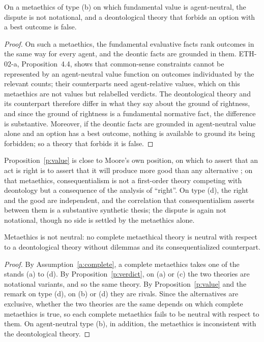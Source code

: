 \documentclass{situationist-preprint}
\begin{document}
\begin{proposition}\label{p:value}
On a metaethics of type (b) on which fundamental value is agent-neutral, the dispute is not notational, and a deontological theory that forbids an option with a best outcome is false.
\end{proposition}

\begin{proof}
On such a metaethics, the fundamental evaluative facts rank outcomes in the same way for every agent, and the deontic facts are grounded in them. ETH-02-a, Proposition~4.4, shows that common-sense constraints cannot be represented by an agent-neutral value function on outcomes individuated by the relevant counts; their counterparts need agent-relative values, which on this metaethics are not values but relabelled verdicts. The deontological theory and its counterpart therefore differ in what they say about the ground of rightness, and since the ground of rightness is a fundamental normative fact, the difference is substantive. Moreover, if the deontic facts are grounded in agent-neutral value alone and an option has a best outcome, nothing is available to ground its being forbidden; so a theory that forbids it is false.
\end{proof}

Proposition~\ref{p:value} is close to Moore's own position, on which to assert that an act is right is to assert that it will produce more good than any alternative \citep[ch.~5]{Moore1903}; on that metaethics, consequentialism is not a first-order theory competing with deontology but a consequence of the analysis of \enquote{right}. On type (d), the right and the good are independent, and the correlation that consequentialism asserts between them is a substantive synthetic thesis; the dispute is again not notational, though no side is settled by the metaethics alone.

\begin{theorem}\label{t:main}
Metaethics is not neutral: no complete metaethical theory is neutral with respect to a deontological theory without dilemmas and its consequentialized counterpart.
\end{theorem}

\begin{proof}
By Assumption~\ref{a:complete}, a complete metaethics takes one of the stands (a) to (d). By Proposition~\ref{p:verdict}, on (a) or (c) the two theories are notational variants, and so the same theory. By Proposition~\ref{p:value} and the remark on type (d), on (b) or (d) they are rivals. Since the alternatives are exclusive, whether the two theories are the same depends on which complete metaethics is true, so each complete metaethics fails to be neutral with respect to them. On agent-neutral type (b), in addition, the metaethics is inconsistent with the deontological theory.
\end{proof}
\end{document}
